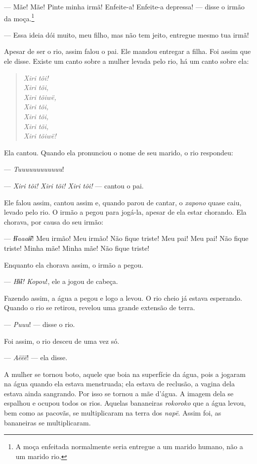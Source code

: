 --- Mãe! Mãe! Pinte minha irmã! Enfeite-a! Enfeite-a depressa! --- disse
o irmão da moça.\footnote{A moça enfeitada normalmente seria entregue a um marido humano, não a um
marido rio.}

--- Essa ideia dói muito, meu filho, mas não tem jeito, entregue mesmo
tua irmã! 

Apesar de ser o rio, assim falou o pai. Ele mandou entregar a filha.
Foi assim que ele disse. Existe um canto sobre a mulher levada pelo rio,
há um canto sobre ela:

\begin{verse}
\textit{Xiri tõi!\\
Xiri tõi,\\
Xiri tõiwë,\\
Xiri tõi,\\
Xiri tõi,\\
Xiri tõi,\\
Xiri tõiwë!}
\end{verse}

Ela cantou. Quando ela pronunciou o nome de seu marido, o rio
respondeu: 

--- \textit{Tuuuuuuuuuuuu}!

--- \textit{Xiri tõi! Xiri tõi! Xiri tõi!} --- cantou o pai. 

Ele falou assim, cantou assim e, quando parou de cantar, o \textit{xapono} quase
caiu, levado pelo rio. O irmão a pegou para jogá-la, apesar de ela estar
chorando. Ela chorava, por causa do seu irmão: 

--- \textit{Ɨ̃ɨaaaɨ̃ɨ}! Meu irmão! Meu irmão! Não fique triste! Meu pai! Meu
pai! Não fique triste! Minha mãe! Minha mãe! Não fique triste! 

Enquanto ela chorava assim, o irmão a pegou. 

--- \textit{Hɨ̃ɨ! Kopou}!, ele a jogou de cabeça. 

Fazendo assim, a água a pegou e logo a levou. O rio cheio já estava
esperando. Quando o rio se retirou, revelou uma grande extensão de
terra. 

--- \textit{Puuu}! --- disse o rio. 

Foi assim, o rio desceu de uma vez só. 

--- \textit{Aëëë}! --- ela disse. 

A mulher se tornou boto, aquele que boia na superfície da água, pois a
jogaram na água quando ela estava menstruada; ela estava de reclusão, a
vagina dela estava ainda sangrando. Por isso se tornou a mãe d'água. 
A imagem dela se espalhou e ocupou todos os rios. Aquelas
bananeiras \textit{rokoroko} que a água levou, bem como as pacovãs, se
multiplicaram na terra dos \textit{napë}. Assim foi, as bananeiras se
multiplicaram. 

